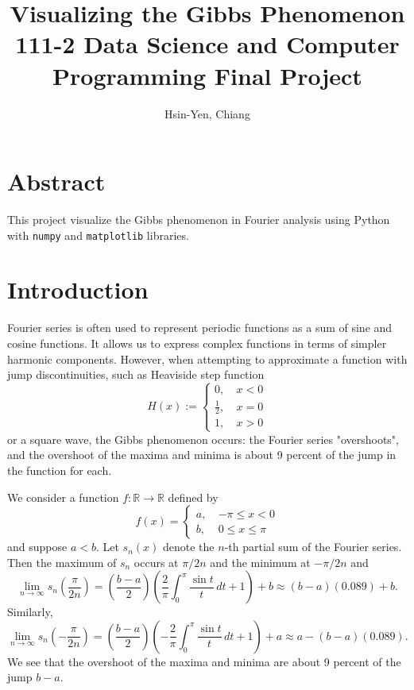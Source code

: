 \documentclass[12pt]{article}
\theoremstyle{definition}
\begin{document}
\title{Visualizing the Gibbs Phenomenon \\
  \large 111-2 Data Science and Computer Programming Final Project}
\author{Hsin-Yen, Chiang}
\maketitle
\section{Abstract}
This project visualize the Gibbs phenomenon in Fourier analysis using Python with \texttt{numpy} and \texttt{matplotlib} libraries.

\section{Introduction}
Fourier series is often used to represent periodic functions as a sum of sine and cosine functions. It allows us to express complex functions in terms of simpler harmonic components. However, when attempting to approximate a function with jump discontinuities, such as Heaviside step function
\[ H(x) := 
\begin{cases}
    0,\ &x<0\\
    \frac{1}{2},\ &x=0\\
    1,\ & x>0
\end{cases}
\]
or a square wave, the Gibbs phenomenon occurs: the Fourier series "overshoots", and the overshoot of the maxima and minima is about 9 percent of the jump in the function for each.

We consider a function $f:\mathbb{R}\to\mathbb{R}$ defined by
\[ f(x) = 
\begin{cases}
    a,\ &-\pi \leq x < 0 \\
    b,\ &0\leq x\leq \pi
\end{cases}
\]
and suppose $a < b$. Let $s_n(x)$ denote the $n$-th partial sum of the Fourier series. Then the maximum of $s_n$ occurs at $\pi/2n$ and the minimum at $-\pi/2n$ and
\[ \lim_{n\to\infty} s_n\left(\frac{\pi}{2n}\right) = \left(\frac{b-a}{2}\right) \left( \frac{2}{\pi} \int_0^\pi \frac{\sin t}{t}\,dt + 1\right) + b \approx (b-a)(0.089) + b. \]
Similarly,
\[ \lim_{n\to\infty} s_n\left(-\frac{\pi}{2n}\right) = \left(\frac{b-a}{2}\right) \left( -\frac{2}{\pi} \int_0^\pi \frac{\sin t}{t}\,dt + 1\right) + a \approx a - (b-a)(0.089).\]
We see that the overshoot of the maxima and minima are about 9 percent of the jump $b-a$.
\end{document}
